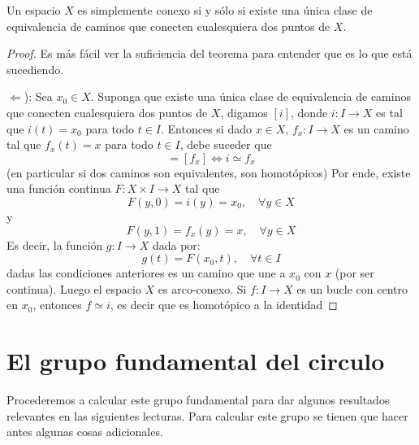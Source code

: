 \documentclass[12pt]{report}
\theoremstyle{largebreak}
\newcommand\cf[3]{\ensuremath{#1:#2\rightarrow#3}}
\begin{document}

    \begin{propo}
        Un espacio $X$ es simplemente conexo si y sólo si existe una única clase de equivalencia de caminos que conecten cualesquiera dos puntos de $X$.
    \end{propo}

    \begin{proof}
        Es más fácil ver la suficiencia del teorema para entender que es lo que está sucediendo.

        $\Leftarrow$): Sea $x_0\in X$. Suponga que existe una única clase de equivalencia de caminos que conecten cualesquiera dos puntos de $X$, digamos $[i]$, donde $\cf{i}{I}{X}$ es tal que $i(t)=x_0$ para todo $t\in I$. Entonces si dado $x\in X$, $\cf{f_x}{I}{X}$ es un camino tal que $f_x(t)=x$ para todo $t\in I$, debe suceder que
        \begin{equation*}
            [i]= [f_x]\iff i\simeq f_x
        \end{equation*}
        (en particular si dos caminos son equivalentes, son homotópicos) Por ende, existe una función continua $\cf{F}{X\times I}{X}$ tal que
        \begin{equation*}
            F(y,0)=i(y)=x_0,\quad\forall y\in X
        \end{equation*}
        y
        \begin{equation*}
            F(y,1)=f_x(y)=x,\quad\forall y\in X
        \end{equation*}
        Es decir, la función $\cf{g}{I}{X}$ dada por:
        \begin{equation*}
            g(t)=F(x_0,t),\quad\forall t\in I
        \end{equation*}
        dadas las condiciones anteriores es un camino que une a $x_0$ con $x$ (por ser continua). Luego el espacio $X$ es arco-conexo. Si $\cf{f}{I}{X}$ es un bucle con centro en $x_0$, entonces $f\simeq i$, es decir que es homotópico a la identidad
    \end{proof}

    \section{El grupo fundamental del circulo}

    Procederemos a calcular este grupo fundamental para dar algunos resultados relevantes en las siguientes lecturas. Para calcular este grupo se tienen que hacer antes algunas cosas adicionales.
\end{document}
